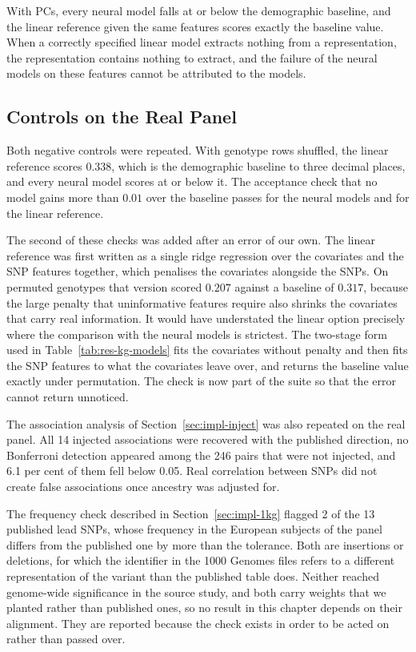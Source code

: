 With PCs, every neural model falls at or below the demographic baseline, and the linear reference given the same features scores exactly the baseline value. When a correctly specified linear model extracts nothing from a representation, the representation contains nothing to extract, and the failure of the neural models on these features cannot be attributed to the models.

\subsection{Controls on the Real Panel}
Both negative controls were repeated. With genotype rows shuffled, the linear reference scores $0.338$, which is the demographic baseline to three decimal places, and every neural model scores at or below it. The acceptance check that no model gains more than $0.01$ over the baseline passes for the neural models and for the linear reference.

The second of these checks was added after an error of our own. The linear reference was first written as a single ridge regression over the covariates and the SNP features together, which penalises the covariates alongside the SNPs. On permuted genotypes that version scored $0.207$ against a baseline of $0.317$, because the large penalty that uninformative features require also shrinks the covariates that carry real information. It would have understated the linear option precisely where the comparison with the neural models is strictest. The two-stage form used in Table~\ref{tab:res-kg-models} fits the covariates without penalty and then fits the SNP features to what the covariates leave over, and returns the baseline value exactly under permutation. The check is now part of the suite so that the error cannot return unnoticed.

The association analysis of Section~\ref{sec:impl-inject} was also repeated on the real panel. All 14 injected associations were recovered with the published direction, no Bonferroni detection appeared among the 246 pairs that were not injected, and 6.1 per cent of them fell below 0.05. Real correlation between SNPs did not create false associations once ancestry was adjusted for.

The frequency check described in Section~\ref{sec:impl-1kg} flagged 2 of the 13 published lead SNPs, whose frequency in the European subjects of the panel differs from the published one by more than the tolerance. Both are insertions or deletions, for which the identifier in the 1000 Genomes files refers to a different representation of the variant than the published table does. Neither reached genome-wide significance in the source study, and both carry weights that we planted rather than published ones, so no result in this chapter depends on their alignment. They are reported because the check exists in order to be acted on rather than passed over.

